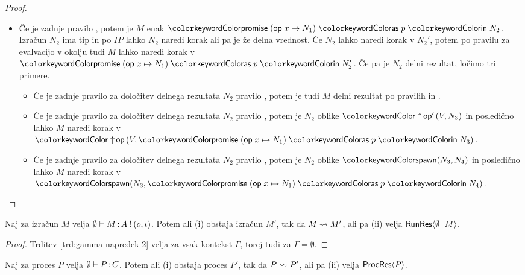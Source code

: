 \begin{proof}
\begin{itemize}
		
		\item Če je zadnje pravilo , potem je $M$ enak $\tmwith{op}{x}{N_1}{p}{N_2}$.
		Izračun $N_2$ ima tip in po $IP$ lahko $N_2$ naredi korak ali pa je že delna vrednost.
		Če $N_2$ lahko naredi korak v $N_2'$, potem po pravilu za evalvacijo v okolju tudi $M$ lahko naredi korak v $\tmwith{op}{x}{N_1}{p}{N_2'}$.
		Če pa je $N_2$ delni rezultat, ločimo tri primere.
		\begin{itemize}
			\item Če je zadnje pravilo za določitev delnega rezultata $N_2$ pravilo , potem je tudi $M$ delni rezultat po pravilih  in .
			\item Če je zadnje pravilo za določitev delnega rezultata $N_2$ pravilo , potem je $N_2$ oblike $\tmopout{op'}{V}{N_3}$ in posledično lahko $M$ naredi korak v $\tmopout{op}{V}{\tmwith{op}{x}{N_1}{p}{N_3}}$.
			\item Če je zadnje pravilo za določitev delnega rezultata $N_2$ pravilo , potem je $N_2$ oblike $\tmspawn{N_3}{N_4}$ in posledično lahko $M$ naredi korak v $\tmspawn{N_3}{\tmwith{op}{x}{N_1}{p}{N_4}}$.
		\end{itemize}
		
	\end{itemize}
	
\end{proof}


\begin{posledica}[o napredku]\label{pos:prazen-napredek-2}
	Naj za izračun $M$ velja $\emptyset \vdash M \mathinner{:} A \mathbin{!} (o, \iota)$. Potem ali (i) obstaja izračun $M'$, tak da $M \leadsto M'$, ali pa (ii) velja $\mathsf{RunRes}\langle\emptyset \,\vert\, M\rangle$.
\end{posledica}

\begin{proof}
	Trditev \ref{trd:gamma-napredek-2} velja za vsak kontekst $\Gamma$, torej tudi za $\Gamma = \emptyset$.
\end{proof}


\begin{izrek}[o napredku]
	Naj za proces $P$ velja $\emptyset \vdash P \mathinner{:} C$. Potem ali (i) obstaja proces $P'$, tak da $P \leadsto P'$, ali pa (ii) velja $\mathsf{ProcRes}\langle P \rangle$.
\end{izrek}

